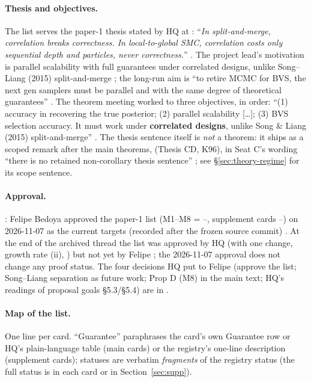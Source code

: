 \paragraph{Thesis and objectives.} The list serves the paper-1 thesis stated by HQ at : ``\emph{In split-and-merge, correlation breaks correctness. In local-to-global SMC, correlation costs only sequential depth and particles, never correctness.}'' . The project lead's motivation is parallel scalability with full guarantees under correlated designs, unlike Song–Liang (2015) split-and-merge ; the long-run aim is ``to retire MCMC for BVS, the next gen samplers must be parallel and with the same degree of theoretical guarantees''  . The theorem meeting worked to three objectives, in order: ``(1) accuracy in recovering the true posterior; (2) parallel scalability [\ldots]; (3) BVS selection accuracy. It must work under \textbf{correlated designs}, unlike Song \& Liang (2015) split-and-merge'' . The thesis sentence itself is \emph{not} a theorem: it ships as a scoped remark after the main theorems,  (Thesis CD, K96), in Seat C's wording ``there is no retained non-corollary thesis sentence'' ; see §\ref{sec:theory-regime} for its scope sentence.

\paragraph{Approval.} \approvedFB: Felipe Bedoya approved the paper-1 list (M1–M8 = –, supplement cards –) on 2026-11-07 as the current targets (recorded after the frozen source commit) . At the end of the archived thread the list was approved by HQ (with one change, growth rate (ii), ) but not yet by Felipe ; the 2026-11-07 approval does not change any proof status. The four decisions HQ put to Felipe (approve the list; Song–Liang separation as future work; Prop D (M8) in the main text; HQ's readings of proposal goals §5.3/§5.4) are in .

\paragraph{Map of the list.} One line per card. ``Guarantee'' paraphrases the card's own Guarantee row or HQ's plain-language table (main cards) or the registry's one-line description (supplement cards); statuses are verbatim \emph{fragments} of the registry status (the full status is in each card or in Section~\ref{sec:supp}).

